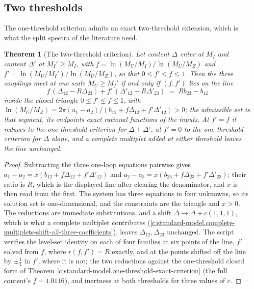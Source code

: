 \documentclass[11pt]{article}
\newtheorem{theorem}{Theorem}[section]
\theoremstyle{definition}
\theoremstyle{plain}
\newcommand{\changedmark}[2]{\marginpar{\raggedright\scriptsize\color{#1}#2}}
\providecommand{\Dl}{}\renewcommand{\Dl}{\Delta}
\begin{document}
\subsection*{Two thresholds}
\label{c:note.standard-model.setting-two-thresholds}
The one-threshold criterion admits an exact two-threshold extension, which is what the split spectra of the literature need.

\begin{theorem}[The two-threshold criterion]\label{c:standard-model.two-threshold-criterion}
\changedmark{gray}{reworded}
Let content $\Dl$ enter at $M_{I}$ and content $\Dl'$ at $M_{I}' \ge M_{I}$, with $f = \ln(M_{U}/M_{I})/\ln(M_{U}/M_{Z})$ and $f' = \ln(M_{U}/M_{I}')/\ln(M_{U}/M_{Z})$, so that $0 \le f' \le f \le 1$. Then the three couplings meet at one scale $M_{U} \ge M_{I}'$ if and only if $(f, f')$ lies on the line
\[
f\,(\Dl_{12} - R\Dl_{23}) + f'\,(\Dl'_{12} - R\Dl'_{23}) \;=\; Rb_{23} - b_{12}
\]
inside the closed triangle $0 \le f' \le f \le 1$, with $\ln(M_{U}/M_{Z}) = 2\pi(a_{1} - a_{2})/(b_{12} + f\Dl_{12} + f'\Dl'_{12}) > 0$; the admissible set is that segment, its endpoints exact rational functions of the inputs. At $f' = f$ it reduces to the one-threshold criterion for $\Dl + \Dl'$, at $f' = 0$ to the one-threshold criterion for $\Dl$ alone, and a complete multiplet added at either threshold leaves the line unchanged.
\end{theorem}
\begin{proof}
Subtracting the three one-loop equations pairwise gives $a_{1} - a_{2} = x(b_{12} + f\Dl_{12} + f'\Dl'_{12})$ and $a_{2} - a_{3} = x(b_{23} + f\Dl_{23} + f'\Dl'_{23})$; their ratio is $R$, which is the displayed line after clearing the denominator, and $x$ is then read from the first. The system has three equations in four unknowns, so its solution set is one-dimensional, and the constraints are the triangle and $x > 0$. The reductions are immediate substitutions, and a shift $\Dl \to \Dl + c(1,1,1)$, which is what a complete multiplet contributes (\ref{c:standard-model.complete-multiplets-shift-all-three-coefficients}), leaves $\Dl_{12}, \Dl_{23}$ unchanged. The script verifies the level-set identity on each of four families at six points of the line, $f'$ solved from $f$, where $r(f, f') = R$ exactly, and at the points shifted off the line by $\pm\tfrac14$ in $f'$, where it is not; the two reductions against the one-threshold closed form of Theorem \ref{c:standard-model.one-threshold-exact-criterion} (the full content's $f = 1.0116$), and inertness at both thresholds for three values of $c$.

\end{proof}
\end{document}
